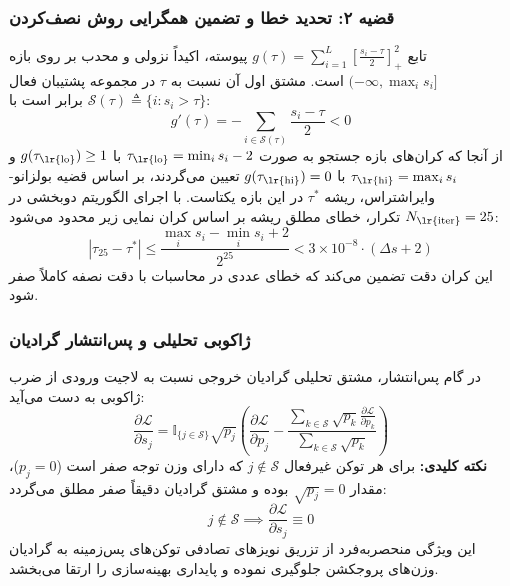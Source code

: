 \subsubsection*{قضیه ۲: تحدید خطا و تضمین همگرایی روش نصف‌کردن }
تابع $g(\tau) = \sum_{i=1}^L \left[ \frac{s_i - \tau}{2} \right]_+^2$ پیوسته، اکیداً نزولی و محدب بر روی بازه $(-\infty, \max_i s_i]$ است. مشتق اول آن نسبت به $\tau$ در مجموعه پشتیبان فعال $\mathcal{S}(\tau) \triangleq \{i : s_i > \tau\}$ برابر است با:
\begin{equation}
g'(\tau) = -\sum_{i \in \mathcal{S}(\tau)} \frac{s_i - \tau}{2} < 0
\end{equation}
از آنجا که کران‌های بازه جستجو به صورت $\tau_{\text{\lr{lo}}} = \min_i s_i - 2$ با $g(\tau_{\text{\lr{lo}}}) \ge 1$ و $\tau_{\text{\lr{hi}}} = \max_i s_i$ با $g(\tau_{\text{\lr{hi}}}) = 0$ تعیین می‌گردند، بر اساس قضیه بولزانو-وایراشتراس، ریشه $\tau^*$ در این بازه یکتاست. با اجرای الگوریتم دوبخشی در $N_{\text{\lr{iter}}} = 25$ تکرار، خطای مطلق ریشه بر اساس کران نمایی زیر محدود می‌شود:
\begin{equation}
|\tau_{25} - \tau^*| \le \frac{\max_i s_i - \min_i s_i + 2}{2^{25}} < 3 \times 10^{-8} \cdot (\Delta s + 2)
\end{equation}
این کران دقت تضمین می‌کند که خطای عددی در محاسبات با دقت نصفه  کاملاً صفر شود.

\subsubsection*{ژاکوبی تحلیلی و پس‌انتشار گرادیان }
در گام پس‌انتشار، مشتق تحلیلی گرادیان خروجی نسبت به لاجیت ورودی از ضرب ژاکوبی به دست می‌آید:
\begin{equation}
\frac{\partial \mathcal{L}}{\partial s_j} = \mathbb{I}_{\{j \in \mathcal{S}\}} \sqrt{p_j} \left( \frac{\partial \mathcal{L}}{\partial p_j} - \frac{\sum_{k \in \mathcal{S}} \sqrt{p_k} \frac{\partial \mathcal{L}}{\partial p_k}}{\sum_{k \in \mathcal{S}} \sqrt{p_k}} \right)
\end{equation}
\textbf{نکته کلیدی:} برای هر توکن غیرفعال $j \notin \mathcal{S}$ که دارای وزن توجه صفر است ($p_j = 0$)، مقدار $\sqrt{p_j} = 0$ بوده و مشتق گرادیان دقیقاً صفر مطلق می‌گردد:
\begin{equation}
j \notin \mathcal{S} \implies \frac{\partial \mathcal{L}}{\partial s_j} \equiv 0
\end{equation}
این ویژگی منحصر‌به‌فرد از تزریق نویزهای تصادفی توکن‌های پس‌زمینه به گرادیان وزن‌های پروجکشن جلوگیری نموده و پایداری بهینه‌سازی را ارتقا می‌بخشد.

